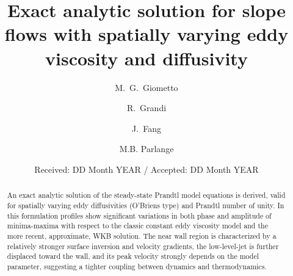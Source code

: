 

\title{Exact analytic solution for slope flows with spatially varying eddy viscosity and diffusivity}



\author{M.~G.~Giometto \and R.~Grandi\and J.~Fang \and M.B. Parlange}


\date{Received: DD Month YEAR / Accepted: DD Month YEAR}


\maketitle

\begin{abstract}
An exact analytic solution of the steady-state Prandtl model equations is derived, valid for spatially varying eddy diffusivities (O'Briens type) and Prandtl number of unity. 
In this formulation profiles show significant variations in both phase and amplitude of minima-maxima with respect to the classic constant eddy viscosity model and the more recent, approximate, WKB solution. 
The near wall region is characterized by a relatively stronger surface inversion and velocity gradients, the low-level-jet is further displaced toward the wall, and its peak velocity strongly depends on the model parameter, suggesting a tighter coupling between dynamics and thermodynamics. 
\end{abstract}


